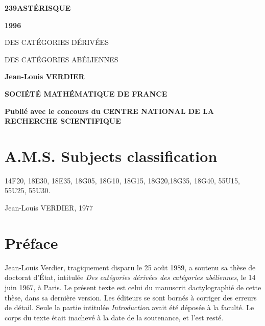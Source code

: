 \begin{titlepage}
  \centering
  {\Huge\bfseries 239\hfill ASTÉRISQUE\par}
  \vspace{1.5em}
  {\LARGE\bfseries 1996\par}
  \vfill
  {\Huge DES CATÉGORIES DÉRIVÉES\par}
  \vspace{0.4em}
  {\Huge DES CATÉGORIES ABÉLIENNES\par}
  \vspace{3em}
  {\Large\bfseries Jean-Louis VERDIER\par}
  \vfill
  {\Large\bfseries SOCIÉTÉ MATHÉMATIQUE DE FRANCE\par}
  \smallskip
  {\small\bfseries Publié avec le concours du CENTRE NATIONAL DE LA RECHERCHE SCIENTIFIQUE\par}
\end{titlepage}

\chapter*{A.M.S. Subjects classification}

14F20, 18E30, 18E35, 18G05, 18G10, 18G15, 18G20,18G35,
18G40, 55U15, 55U25, 55U30.

\clearpage
{}
\thispagestyle{empty}
\vspace*{0.62\textheight}
\begin{center}
Jean-Louis VERDIER, 1977
\end{center}

\clearpage
{}
\thispagestyle{empty}
\null
\clearpage

\chapter*{Préface}

Jean-Louis Verdier, tragiquement disparu le 25 août 1989, a soutenu sa thèse
de doctorat d'État, intitulée \emph{Des catégories dérivées des catégories
abéliennes}, le 14 juin 1967, à Paris. Le présent texte est celui du manuscrit
dactylographié de cette thèse, dans sa dernière version. Les éditeurs se sont
bornés à corriger des erreurs de détail. Seule la partie intitulée
\emph{Introduction} avait été déposée à la faculté. Le corps du texte était
inachevé à la date de la soutenance, et l'est resté.

